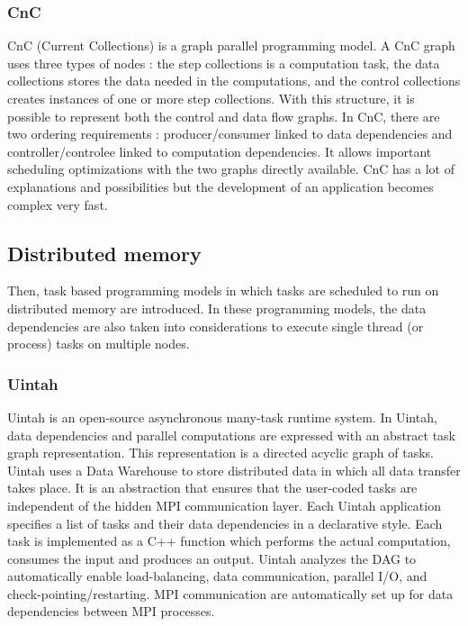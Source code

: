 \subsubsection{CnC}
CnC \cite{ChaKV2010} \cite{BBCKL2010} (Current Collections) is a graph parallel programming model.
A CnC graph uses three types of nodes : the step collections is a computation task, the data collections stores the data needed in the computations, and the control collections creates instances of one or more step collections.
With this structure, it is possible to represent both the control and data flow graphs.
In CnC, there are two ordering requirements : producer/consumer linked to data dependencies and controller/controlee linked to computation dependencies.
It allows important scheduling optimizations with the two graphs directly available.
CnC has a lot of explanations and possibilities but the development of an application becomes complex very fast.

\subsection{Distributed memory}
Then, task based programming models in which tasks are scheduled to run on distributed memory are introduced.
In these programming models, the data dependencies are also taken into considerations to execute single thread (or process) tasks on multiple nodes.

\subsubsection{Uintah}
Uintah \cite{GeCPJ2000} \cite{HumpB2019} is an open-source asynchronous many-task runtime system.
In Uintah, data dependencies and parallel computations are expressed with an abstract task graph representation.
This representation is a directed acyclic graph of tasks.
Uintah uses a Data Warehouse to store distributed data in which all data transfer takes place.
It is an abstraction that ensures that the user-coded tasks are independent of the hidden MPI communication layer.
Each Uintah application specifies a list of tasks and their data dependencies in a declarative style.
Each task is implemented as a C++ function which performs the actual computation, consumes the input and produces an output.
Uintah analyzes the DAG to automatically enable load-balancing, data communication, parallel I/O, and check-pointing/restarting.
MPI communication are automatically set up for data dependencies between MPI processes.

